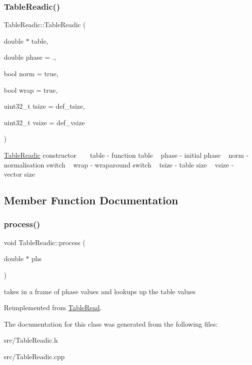 \subsubsection{\texorpdfstring{Table\+Readic()}{TableReadic()}}
{\footnotesize\ttfamily Table\+Readic\+::\+Table\+Readic (\begin{DoxyParamCaption}\item[{double $\ast$}]{table,  }\item[{double}]{phase = {.},  }\item[{bool}]{norm = {\ttfamily true},  }\item[{bool}]{wrap = {\ttfamily true},  }\item[{uint32\+\_\+t}]{tsize = {\ttfamily def\+\_\+tsize},  }\item[{uint32\+\_\+t}]{vsize = {\ttfamily def\+\_\+vsize} }\end{DoxyParamCaption})\hspace{0.3cm}{\ttfamily [inline]}}

\hyperlink{class_table_readic}{Table\+Readic} constructor ~\newline
~\newline
table -\/ function table ~\newline
phase -\/ initial phase ~\newline
norm -\/ normalisation switch ~\newline
wrap -\/ wraparound switch ~\newline
tsize -\/ table size ~\newline
vsize -\/ vector size ~\newline


\subsection{Member Function Documentation}
\mbox{\label{class_table_readic_acc300e7cf5cf06af7d4aa06dde917f3c}} 
\subsubsection{\texorpdfstring{process()}{process()}}
{\footnotesize\ttfamily void Table\+Readic\+::process (\begin{DoxyParamCaption}\item[{double $\ast$}]{phs }\end{DoxyParamCaption})\hspace{0.3cm}{\ttfamily [virtual]}}

takes in a frame of phase values and lookups up the table values 

Reimplemented from \hyperlink{class_table_read_ada219536a398309150f5f1270ac9534e}{Table\+Read}.



The documentation for this class was generated from the following files\+:\begin{DoxyCompactItemize}
\item 
src/Table\+Readic.\+h\item 
src/Table\+Readic.\+cpp\end{DoxyCompactItemize}
